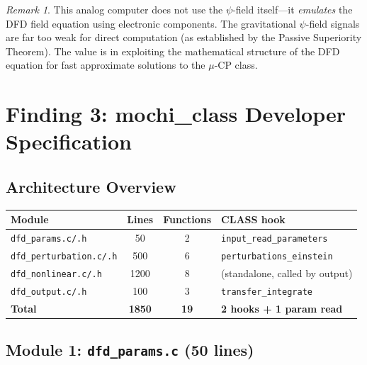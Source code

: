 \documentclass[11pt]{article}
\theoremstyle{definition}
\theoremstyle{remark}
\newtheorem{remark}[theorem]{Remark}
\begin{document}
\begin{remark}
This analog computer does not use the $\psi$-field itself---it
\emph{emulates} the DFD field equation using electronic components.
The gravitational $\psi$-field signals are far too weak for direct
computation (as established by the Passive Superiority Theorem).
The value is in exploiting the mathematical structure of the DFD
equation for fast approximate solutions to the $\mu$-CP class.
\end{remark}


\section{Finding 3: mochi\_class Developer Specification}
\label{sec:mochi}

\subsection{Architecture Overview}

\begin{center}
\begin{tabular}{lccl}
\toprule
\textbf{Module} & \textbf{Lines} & \textbf{Functions} & \textbf{CLASS hook} \\
\midrule
\texttt{dfd\_params.c/.h} & 50 & 2 & \texttt{input\_read\_parameters} \\
\texttt{dfd\_perturbation.c/.h} & 500 & 6 & \texttt{perturbations\_einstein} \\
\texttt{dfd\_nonlinear.c/.h} & 1200 & 8 & (standalone, called by output) \\
\texttt{dfd\_output.c/.h} & 100 & 3 & \texttt{transfer\_integrate} \\
\midrule
\textbf{Total} & \textbf{1850} & \textbf{19} & \textbf{2 hooks + 1 param read} \\
\bottomrule
\end{tabular}
\end{center}

\subsection{Module 1: \texttt{dfd\_params.c} (50 lines)}
\end{document}
